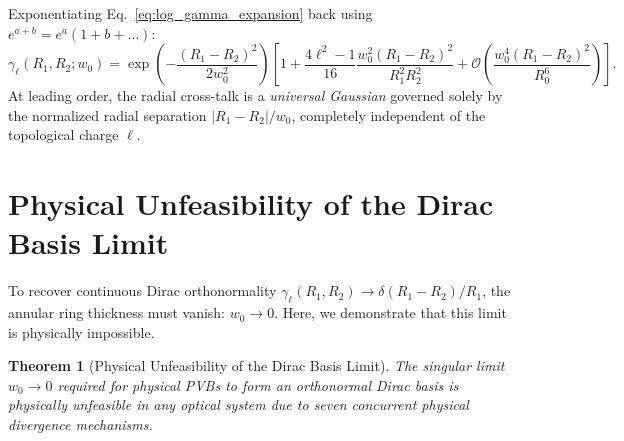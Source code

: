 \documentclass[11pt,a4paper]{article}
\newtheorem{theorem}{Theorem}
\begin{document}
Exponentiating Eq.~\eqref{eq:log_gamma_expansion} back using $e^{a + b} = e^a (1 + b + \dots)$:
\begin{equation}
\boxed{\gamma_\ell(R_1, R_2; w_0) = \exp\left( - \frac{(R_1 - R_2)^2}{2 w_0^2} \right) \left[ 1 + \frac{4\ell^2 - 1}{16} \frac{w_0^2 (R_1 - R_2)^2}{R_1^2 R_2^2} + \mathcal{O}\left( \frac{w_0^4 (R_1 - R_2)^2}{R_0^6} \right) \right].}
\label{eq:asymptotic_overlap}
\end{equation}
At leading order, the radial cross-talk is a \emph{universal Gaussian} governed solely by the normalized radial separation $|R_1 - R_2| / w_0$, completely independent of the topological charge $\ell$.

\section{Physical Unfeasibility of the Dirac Basis Limit}
\label{sec:unfeasibility}

To recover continuous Dirac orthonormality $\gamma_\ell(R_1, R_2) \to \delta(R_1 - R_2) / R_1$, the annular ring thickness must vanish: $w_0 \to 0$. Here, we demonstrate that this limit is physically impossible.

\begin{theorem}[Physical Unfeasibility of the Dirac Basis Limit]
\label{thm:unfeasibility}
The singular limit $w_0 \to 0$ required for physical PVBs to form an orthonormal Dirac basis is physically unfeasible in any optical system due to seven concurrent physical divergence mechanisms.
\end{theorem}
\end{document}

